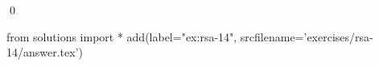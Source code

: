
\begin{ex} 
  \label{ex:rsa-14}
  
  \qed
\end{ex} 
\begin{python0}
from solutions import *
add(label="ex:rsa-14",
    srcfilename='exercises/rsa-14/answer.tex') 
\end{python0}
